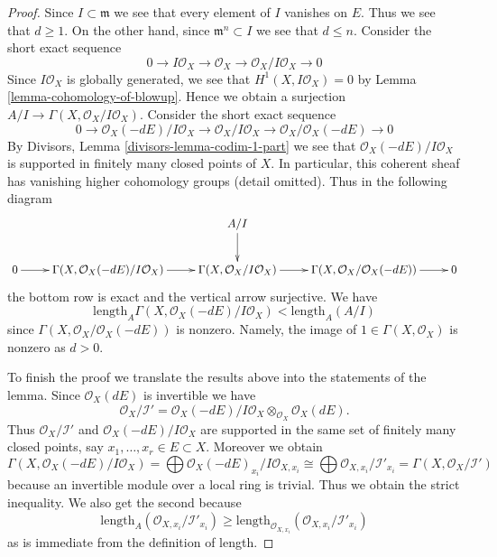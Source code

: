 \documentclass{stacks-project}
\theoremstyle{plain}
\theoremstyle{definition}
\theoremstyle{remark}
\numberwithin{equation}{subsection}
\begin{document}
\begin{proof}
Since $I \subset \mathfrak m$ we see that every element of $I$
vanishes on $E$. Thus we see that $d \geq 1$. On the other hand, since
$\mathfrak m^n \subset I$ we see that $d \leq n$. Consider the
short exact sequence
$$
0 \to I\mathcal{O}_X \to \mathcal{O}_X \to \mathcal{O}_X/I\mathcal{O}_X \to 0
$$
Since $I\mathcal{O}_X$ is globally generated, we see that
$H^1(X, I\mathcal{O}_X) = 0$ by Lemma \ref{lemma-cohomology-of-blowup}.
Hence we obtain a surjection
$A/I \to \Gamma(X, \mathcal{O}_X/I\mathcal{O}_X)$. Consider the short exact
sequence
$$
0 \to
\mathcal{O}_X(-dE)/I\mathcal{O}_X \to
\mathcal{O}_X/I\mathcal{O}_X \to
\mathcal{O}_X/\mathcal{O}_X(-dE) \to 0
$$
By Divisors, Lemma \ref{divisors-lemma-codim-1-part}
we see that $\mathcal{O}_X(-dE)/I\mathcal{O}_X$ is supported in finitely many
closed points of $X$. In particular, this coherent sheaf has vanishing higher
cohomology groups (detail omitted). Thus in the following diagram
$$
\xymatrix{
& & A/I \ar[d] \\
0 \ar[r] &
\Gamma(X, \mathcal{O}_X(-dE)/I\mathcal{O}_X) \ar[r] &
\Gamma(X, \mathcal{O}_X/I\mathcal{O}_X) \ar[r] &
\Gamma(X, \mathcal{O}_X/\mathcal{O}_X(-dE)) \ar[r] & 0
}
$$
the bottom row is exact and the vertical arrow surjective. We have
$$
\text{length}_A \Gamma(X, \mathcal{O}_X(-dE)/I\mathcal{O}_X) <
\text{length}_A(A/I)
$$
since $\Gamma(X, \mathcal{O}_X/\mathcal{O}_X(-dE))$ is nonzero.
Namely, the image of $1 \in \Gamma(X, \mathcal{O}_X)$
is nonzero as $d > 0$.

\medskip\noindent
To finish the proof we translate the results above into the statements
of the lemma. Since
$\mathcal{O}_X(dE)$ is invertible we have
$$
\mathcal{O}_X/\mathcal{I}' =
\mathcal{O}_X(-dE)/I\mathcal{O}_X \otimes_{\mathcal{O}_X} \mathcal{O}_X(dE).
$$
Thus $\mathcal{O}_X/\mathcal{I}'$ and $\mathcal{O}_X(-dE)/I\mathcal{O}_X$
are supported in the same set of finitely many
closed points, say $x_1, \ldots, x_r \in E \subset X$.
Moreover we obtain
$$
\Gamma(X, \mathcal{O}_X(-dE)/I\mathcal{O}_X) =
\bigoplus \mathcal{O}_X(-dE)_{x_i}/I\mathcal{O}_{X, x_i}
\cong
\bigoplus \mathcal{O}_{X, x_i}/\mathcal{I}'_{x_i} =
\Gamma(X, \mathcal{O}_X/\mathcal{I}')
$$
because an invertible module over a local ring is trivial.
Thus we obtain the strict inequality. We also get the second because
$$
\text{length}_A(\mathcal{O}_{X, x_i}/\mathcal{I}'_{x_i}) \geq
\text{length}_{\mathcal{O}_{X, x_i}}(\mathcal{O}_{X, x_i}/\mathcal{I}'_{x_i})
$$
as is immediate from the definition of length.
\end{proof}
\end{document}
